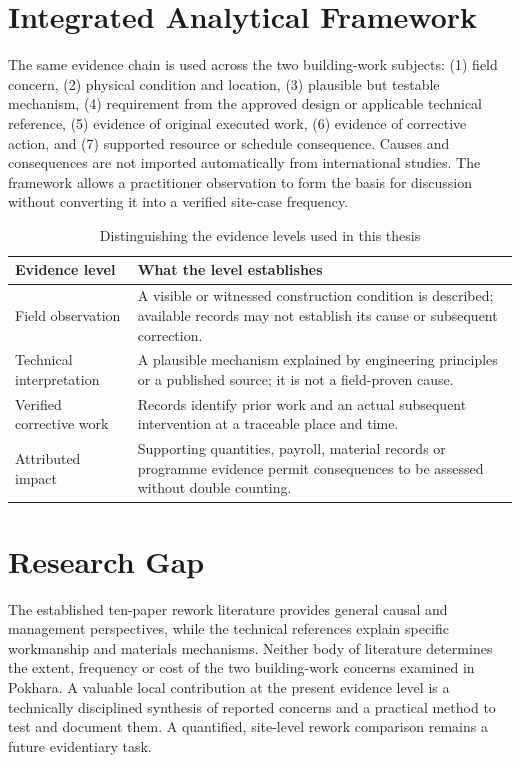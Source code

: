 \section{Integrated Analytical Framework}
The same evidence chain is used across the two building-work subjects: (1) field concern, (2) physical condition and location, (3) plausible but testable mechanism, (4) requirement from the approved design or applicable technical reference, (5) evidence of original executed work, (6) evidence of corrective action, and (7) supported resource or schedule consequence. Causes and consequences are not imported automatically from international studies. The framework allows a practitioner observation to form the basis for discussion without converting it into a verified site-case frequency.

\begin{table}[htbp]
\caption{Distinguishing the evidence levels used in this thesis}
\label{tab:evidencelevels}
\centering
\begin{tabularx}{\textwidth}{@{}L{3.6cm}X@{}}
\toprule Evidence level & What the level establishes \\ \midrule
Field observation & A visible or witnessed construction condition is described; available records may not establish its cause or subsequent correction.\\
Technical interpretation & A plausible mechanism explained by engineering principles or a published source; it is not a field-proven cause.\\
Verified corrective work & Records identify prior work and an actual subsequent intervention at a traceable place and time.\\
Attributed impact & Supporting quantities, payroll, material records or programme evidence permit consequences to be assessed without double counting.\\ \bottomrule
\end{tabularx}
\end{table}

\section{Research Gap}
The established ten-paper rework literature provides general causal and management perspectives, while the technical references explain specific workmanship and materials mechanisms. Neither body of literature determines the extent, frequency or cost of the two building-work concerns examined in Pokhara. A valuable local contribution at the present evidence level is a technically disciplined synthesis of reported concerns and a practical method to test and document them. A quantified, site-level rework comparison remains a future evidentiary task.
